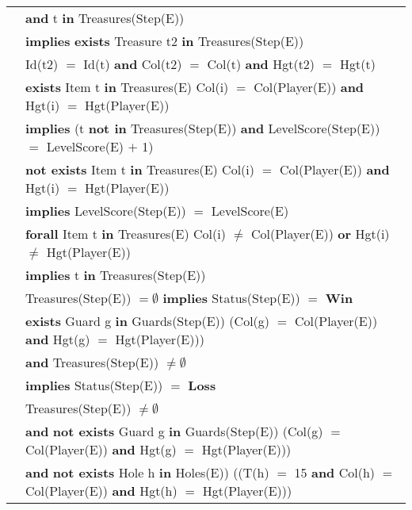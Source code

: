 \documentclass[8pt]{article}
\begin{document}
{\begin{longtable}{rl}
  & \quad\quad \textbf{and} t \textbf{in} \textrm{Treasures(Step(E))} \\
  & \quad\quad \textbf{implies} \textbf{exists} \textrm{Treasure} t2 \textbf{in} \textrm{Treasures(Step(E))}\\
  & \quad\quad\quad\quad \textrm{Id(t2)} $=$ \textrm{Id(t)} \textbf{and} \textrm{Col(t2)} $=$ \textrm{Col(t)} \textbf{and} \textrm{Hgt(t2)} $=$ \textrm{Hgt(t)}\\
  & \textbf{exists} \textrm{Item} t \textbf{in} \textrm{Treasures(E)} \textrm{Col(i)} $=$ \textrm{Col(Player(E))} \textbf{and} \textrm{Hgt(i)} $=$ \textrm{Hgt(Player(E))}\\
  & \quad\quad \textbf{implies} (t \textbf{not in} Treasures(Step(E)) \textbf{and} \textrm{LevelScore(Step(E))} $=$ \textrm{LevelScore(E)} $+$ 1)\\
  & \textbf{not exists} \textrm{Item} t \textbf{in} \textrm{Treasures(E)} \textrm{Col(i)} $=$ \textrm{Col(Player(E))} \textbf{and} \textrm{Hgt(i)} $=$ \textrm{Hgt(Player(E))}\\
  & \quad\quad \textbf{implies} \textrm{LevelScore(Step(E))} $=$ \textrm{LevelScore(E)}\\
  & \textbf{forall} \textrm{Item} t \textbf{in} \textrm{Treasures(E)} \textrm{Col(i)} $\ne$ \textrm{Col(Player(E))} \textbf{or} \textrm{Hgt(i)} $\ne$ \textrm{Hgt(Player(E))}\\
  & \quad\quad \textbf{implies} t \textbf{in} \textrm{Treasures(Step(E))}\\
  & \textrm{Treasures(Step(E))} $= \emptyset$ \textbf{implies} \textrm{Status(Step(E))} $=$ \textbf{Win}\\
  & \textbf{exists} \textrm{Guard} g \textbf{in} \textrm{Guards(Step(E))} (\textrm{Col(g)} $=$ \textrm{Col(Player(E))} \textbf{and} \textrm{Hgt(g)} $=$ \textrm{Hgt(Player(E))}) \\
  & \quad\quad \textbf{and} \textrm{Treasures(Step(E))} $\neq \emptyset$\\
  & \quad\quad \textbf{implies} \textrm{Status(Step(E))} $=$ \textbf{Loss}\\
  & \textrm{Treasures(Step(E))} $\ne \emptyset$\\
  & \quad\quad \textbf{and} \textbf{not exists} \textrm{Guard} g \textbf{in} \textrm{Guards(Step(E))} (\textrm{Col(g)} $=$ \textrm{Col(Player(E))} \textbf{and} \textrm{Hgt(g)} $=$ \textrm{Hgt(Player(E))}) \\
  & \quad\quad \textbf{and} \textbf{not exists} \textrm{Hole} h \textbf{in} \textrm{Holes(E))} (\textrm(T(h) $=$ 15 \textbf{and} \textrm{Col(h)} $=$ \textrm{Col(Player(E))} \textbf{and} \textrm{Hgt(h)} $=$ \textrm{Hgt(Player(E))})\\

\end{longtable}}
\end{document}
